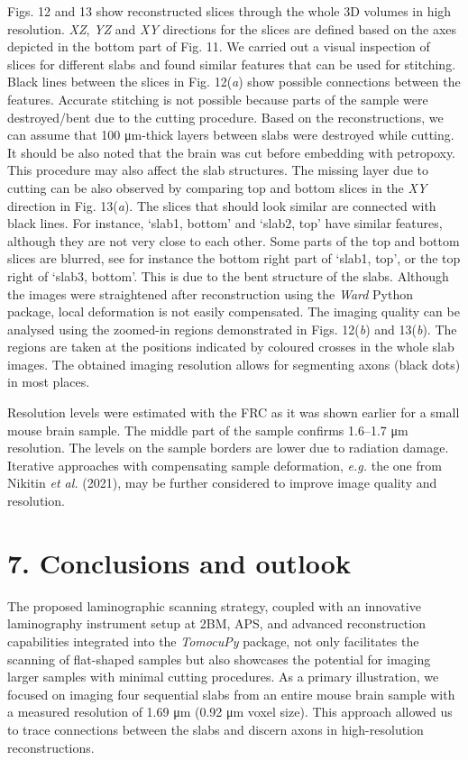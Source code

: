 \documentclass{article}
\begin{document}
Figs. 12 and 13 show reconstructed slices through the whole 3D volumes in high resolution. \emph{XZ}, \emph{YZ} and \emph{XY} directions for the slices are defined based on the axes depicted in the bottom part of Fig. 11. We carried out a visual inspection of slices for different slabs and found similar features that can be used for stitching. Black lines between the slices in Fig. 12(\emph{a}) show possible connections between the features. Accurate stitching is not possible because parts of the sample were destroyed/bent due to the cutting procedure. Based on the reconstructions, we can assume that 100 μm-thick layers between slabs were destroyed while cutting. It should be also noted that the brain was cut before embedding with petropoxy. This procedure may also affect the slab structures. The missing layer due to cutting can be also observed by comparing top and bottom slices in the \emph{XY} direction in Fig. 13(\emph{a}). The slices that should look similar are connected with black lines. For instance, ‘slab1, bottom’ and ‘slab2, top’ have similar features, although they are not very close to each other. Some parts of the top and bottom slices are blurred, see for instance the bottom right part of ‘slab1, top’, or the top right of ‘slab3, bottom’. This is due to the bent structure of the slabs. Although the images were straightened after reconstruction using the \emph{Ward} Python package, local deformation is not easily compensated. The imaging quality can be analysed using the zoomed-in regions demonstrated in Figs. 12(\emph{b}) and 13(\emph{b}). The regions are taken at the positions indicated by coloured crosses in the whole slab images. The obtained imaging resolution allows for segmenting axons (black dots) in most places.

Resolution levels were estimated with the FRC as it was shown earlier for a small mouse brain sample. The middle part of the sample confirms 1.6–1.7 μm resolution. The levels on the sample borders are lower due to radiation damage. Iterative approaches with compensating sample deformation, \emph{e.g.} the one from Nikitin \emph{et al.} (2021), may be further considered to improve image quality and resolution.

\section*{7. Conclusions and outlook}

The proposed laminographic scanning strategy, coupled with an innovative laminography instrument setup at 2BM, APS, and advanced reconstruction capabilities integrated into the \emph{TomocuPy} package, not only facilitates the scanning of flat-shaped samples but also showcases the potential for imaging larger samples with minimal cutting procedures. As a primary illustration, we focused on imaging four sequential slabs from an entire mouse brain sample with a measured resolution of 1.69 μm (0.92 μm voxel size). This approach allowed us to trace connections between the slabs and discern axons in high-resolution reconstructions.
\end{document}

